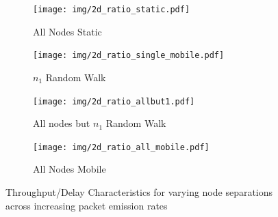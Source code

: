 \documentclass[runningheads,a4paper]{llncs}
\begin{document}
\begin{figure}
\begin{subfigure}{.5\textwidth}
    \centering
  \texttt{[image: img/2d\_ratio\_static.pdf]}
  \caption{All Nodes Static}
  \label{fig:2d_throughput_static}
\end{subfigure}%
\begin{subfigure}{.5\textwidth}
  \centering
  \texttt{[image: img/2d\_ratio\_single\_mobile.pdf]}
  \caption{$n_1$ Random Walk}
  \label{fig:2d_throughput_single_mobile}
\end{subfigure}
\begin{subfigure}{.5\textwidth}
\centering
  \texttt{[image: img/2d\_ratio\_allbut1.pdf]}
  \caption{All nodes but $n_1$ Random Walk}
  \label{fig:2d_throughput_allbut1}
\end{subfigure}
\begin{subfigure}{.5\textwidth}
\centering
  \texttt{[image: img/2d\_ratio\_all\_mobile.pdf]}
  \caption{All Nodes Mobile}
  \label{fig:2d_throughput_all_mobile}
\end{subfigure}
\caption{Throughput/Delay Characteristics for varying node separations across increasing packet emission rates}
\label{fig:scenario_throughputratios_2d}
\end{figure}
\end{document}
